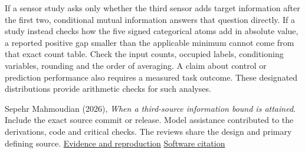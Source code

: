 If a sensor study asks only whether the third sensor adds target information after the first two, conditional mutual information answers that question directly. If a study instead checks how the five signed categorical atoms add in absolute value, a reported positive gap smaller than the applicable minimum cannot come from that exact count table. Check the input counts, occupied labels, conditioning variables, rounding and the order of averaging. A claim about control or prediction performance also requires a measured task outcome. These designated distributions provide arithmetic checks for such analyses.

Sepehr Mahmoudian (2026), \emph{When a third-source information bound is attained}. Include the exact source commit or release. Model assistance contributed to the derivations, code and critical checks. The reviews share the design and primary defining source. \href{https://github.com/sepahead/pid-rs/blob/main/audit/research/categorical-third-source-budget-sharpness/EVIDENCE.md}{Evidence and reproduction} \href{https://github.com/sepahead/pid-rs/blob/main/CITATION.cff}{Software citation}

